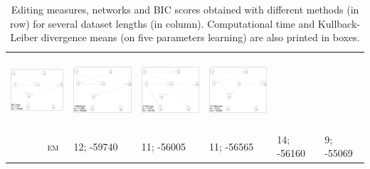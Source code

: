 \begin{table}[!p]
\begin{tabular}{r@{}p{2.9cm}@{}p{2.9cm}@{}p{2.9cm}@{}p{2.9cm}@{}p{2.90cm}}
\includegraphics[width=29.34mm, height=26.7mm]{fig/GES-EM-1000} &
\includegraphics[width=29.34mm, height=26.7mm]{fig/GES-EM-2000} &
\includegraphics[width=29.34mm, height=26.7mm]{fig/GES-EM-5000} &
\includegraphics[width=29.34mm, height=26.7mm]{fig/GES-EM-10000} \\
\textsc{em~}
& 12; -59740 & 11; -56005 & 11; -56565 & 14; -56160 & 9; -55069 \\
\end{tabular}
\caption{Editing measures, networks and BIC scores obtained with different methods (in row) for several dataset lengths (in column). Computational time and Kullback-Leiber divergence means (on five parameters learning) are also printed in boxes.}
\label{inc1}
\end{table}
